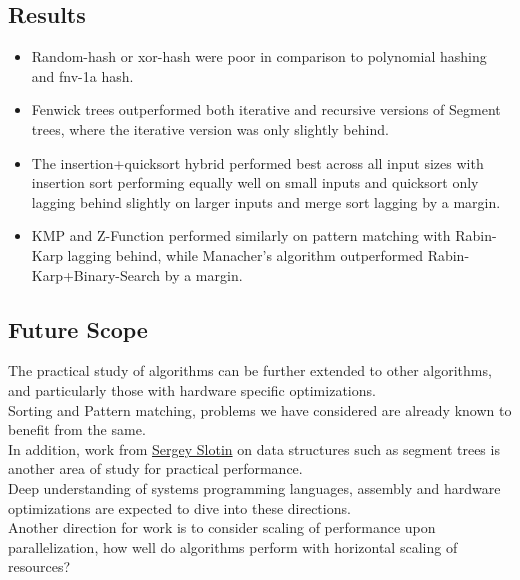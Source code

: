 \documentclass[12pt]{article}
\begin{document}
\subsection{Results}
\begin{itemize}
  \item Random-hash or xor-hash were poor in comparison to polynomial hashing and fnv-1a hash.
  \item Fenwick trees outperformed both iterative and recursive versions of Segment trees, where the iterative version was only slightly behind.
  \item The insertion+quicksort hybrid performed best across all input sizes with insertion sort performing equally well on small inputs and quicksort only lagging behind slightly on larger inputs and merge sort lagging by a margin.
  \item KMP and Z-Function performed similarly on pattern matching with Rabin-Karp lagging behind, while Manacher's algorithm outperformed Rabin-Karp+Binary-Search by a margin.
\end{itemize}

\subsection{Future Scope}
The practical study of algorithms can be further extended to other algorithms, and particularly those with hardware specific optimizations.\\
Sorting\cite{google_vectorized_quicksort} and Pattern matching\cite{stackoverflow_stringfind_complexity}, problems we have considered are already known to benefit from the same. \\
In addition, work from \hyperref[http://sereja.me/]{Sergey Slotin} on data structures\cite{sslotin_book} such as segment trees \cite{wide_segment_tree} is another area of study for practical performance. \\
Deep understanding of systems programming languages, assembly and hardware optimizations are expected to dive into these directions.  \\
Another direction for work is to consider scaling of performance upon parallelization, how well do algorithms perform with horizontal scaling of resources?
\end{document}
